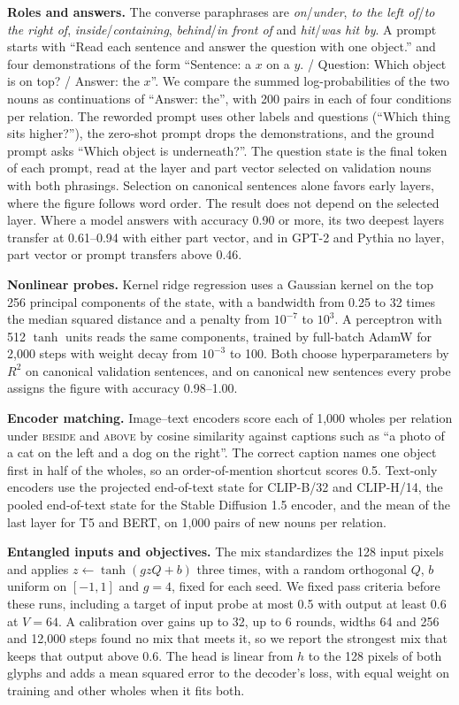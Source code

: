 \documentclass[10pt]{article}
\theoremstyle{plain}
\theoremstyle{remark}
\begin{document}
\textbf{Roles and answers.} The converse paraphrases are \emph{on}/\emph{under}, \emph{to the left of}/\emph{to the right of}, \emph{inside}/\emph{containing}, \emph{behind}/\emph{in front of} and \emph{hit}/\emph{was hit by}. A prompt starts with ``Read each sentence and answer the question with one object.'' and four demonstrations of the form ``Sentence: a $x$ on a $y$. / Question: Which object is on top? / Answer: the $x$''. We compare the summed log-probabilities of the two nouns as continuations of ``Answer: the'', with 200 pairs in each of four conditions per relation. The reworded prompt uses other labels and questions (``Which thing sits higher?''), the zero-shot prompt drops the demonstrations, and the ground prompt asks ``Which object is underneath?''. The question state is the final token of each prompt, read at the layer and part vector selected on validation nouns with both phrasings. Selection on canonical sentences alone favors early layers, where the figure follows word order. The result does not depend on the selected layer. Where a model answers with accuracy 0.90 or more, its two deepest layers transfer at 0.61--0.94 with either part vector, and in GPT-2 and Pythia no layer, part vector or prompt transfers above 0.46.

\textbf{Nonlinear probes.}\label{app:e19} Kernel ridge regression uses a Gaussian kernel on the top 256 principal components of the state, with a bandwidth from 0.25 to 32 times the median squared distance and a penalty from $10^{-7}$ to $10^{3}$. A perceptron with 512 $\tanh$ units reads the same components, trained by full-batch AdamW for 2{,}000 steps with weight decay from $10^{-3}$ to 100. Both choose hyperparameters by $R^2$ on canonical validation sentences, and on canonical new sentences every probe assigns the figure with accuracy 0.98--1.00.

\textbf{Encoder matching.} Image--text encoders score each of 1{,}000 wholes per relation under \textsc{beside} and \textsc{above} by cosine similarity against captions such as ``a photo of a cat on the left and a dog on the right''. The correct caption names one object first in half of the wholes, so an order-of-mention shortcut scores 0.5. Text-only encoders use the projected end-of-text state for CLIP-B/32 and CLIP-H/14, the pooled end-of-text state for the Stable Diffusion 1.5 encoder, and the mean of the last layer for T5 and BERT, on 1{,}000 pairs of new nouns per relation.

\textbf{Entangled inputs and objectives.} The mix standardizes the 128 input pixels and applies $z \leftarrow \tanh(g z Q + b)$ three times, with a random orthogonal $Q$, $b$ uniform on $[-1, 1]$ and $g = 4$, fixed for each seed. We fixed pass criteria before these runs, including a target of input probe at most 0.5 with output at least 0.6 at $V = 64$. A calibration over gains up to 32, up to 6 rounds, widths 64 and 256 and 12{,}000 steps found no mix that meets it, so we report the strongest mix that keeps that output above 0.6. The head is linear from $h$ to the 128 pixels of both glyphs and adds a mean squared error to the decoder's loss, with equal weight on training and other wholes when it fits both.
\end{document}
